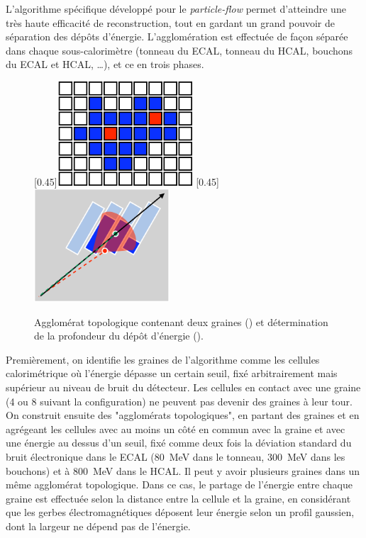 L'algorithme spécifique développé pour le \emph{particle-flow} permet d'atteindre une très haute efficacité de reconstruction, tout en gardant un grand pouvoir de séparation des dépôts d'énergie. L'agglomération est effectuée de façon séparée dans chaque sous-calorimètre (tonneau du ECAL, tonneau du HCAL, bouchons du ECAL et HCAL, \ldots), et ce en trois phases.

\medskip

\begin{figure}
  \subcaptionbox{\label{fig:calo_topo}}[0.45\textwidth]{\includegraphics[width=0.45\textwidth]{chapitre3/figs/calo_topoclus_seeds.pdf}}\hfill
  \subcaptionbox{\label{fig:calo_depth}}[0.45\textwidth]{\includegraphics[width=0.45\textwidth]{chapitre3/figs/calo_depthcor.pdf}}
  \caption{Agglomérat topologique contenant deux graines () et détermination de la profondeur du dépôt d'énergie ().}
\end{figure}

Premièrement, on identifie les graines de l'algorithme comme les cellules calorimétrique où l'énergie dépasse un certain seuil, fixé arbitrairement mais supérieur au niveau de bruit du détecteur. Les cellules en contact avec une graine (4 ou 8 suivant la configuration) ne peuvent pas devenir des graines à leur tour. On construit ensuite des "agglomérats topologiques", en partant des graines et en agrégeant les cellules avec au moins un côté en commun avec la graine et avec une énergie au dessus d'un seuil, fixé comme deux fois la déviation standard du bruit électronique dans le ECAL (\SI{80}{\MeV} dans le tonneau, \tilde \SI{300}{\MeV} dans les bouchons) et à \SI{800}{\MeV} dans le HCAL. Il peut y avoir plusieurs graines dans un même agglomérat topologique. Dans ce cas, le partage de l'énergie entre chaque graine est effectuée selon la distance entre la cellule et la graine, en considérant que les gerbes électromagnétiques déposent leur énergie selon un profil gaussien, dont la largeur ne dépend pas de l'énergie.

